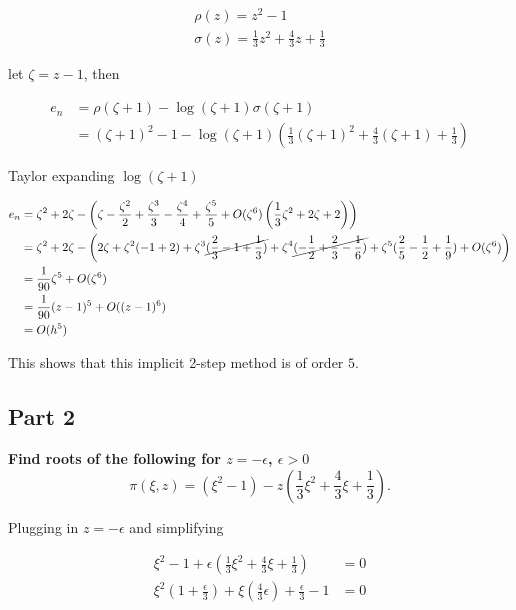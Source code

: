\documentclass[12pt,a4paper]{article}
\begin{document}
 \begin{align*}
   \rho(z) = z^{2}-1 \\
   \sigma(z) = \frac{1}{3}z^{2} + \frac{4}{3}z + \frac{1}{3}
 \end{align*}

 let $ \zeta=z-1$, then
 
 \begin{align*}
   e_n &=\rho( \zeta + 1) - \log( \zeta + 1) \sigma( \zeta + 1) \\
        &= ( \zeta + 1)^{2} -1 -\log( \zeta + 1) \left( \frac{1}{3} ( \zeta
       +1)^{2} + \frac{4}{3}( \zeta + 1) + \frac{1}{3} \right)
 \end{align*}

 Taylor expanding $\log( \zeta+1)$

 \begin{align*}
   e_n &= \zeta^2 + 2 \zeta - \left( \zeta - \frac{\zeta^{2}}{2}
   + \frac{\zeta^{3}}{3} - \frac{\zeta^{4}}{4} + \frac{\zeta^{5}}{5} + O(
 \zeta^{6}) \left( \frac{1}{3} \zeta^{2} + 2 \zeta + 2\right)\right) \\
       &=\zeta^2 + 2 \zeta - \left(2 \zeta + \zeta^{2}(-1+2)
         + \zeta^{3}\cancel{(
         \frac{2}{3} -1 + \frac{1}{3})} + \zeta^{4}\cancel{(- \frac{1}{2} + \frac{2}{3}
       - \frac{1}{6})} + \zeta^{5} (\frac{2}{5}- \frac{1}{2} + \frac{1}{9}) + O(
   \zeta^{6})\right) \\
       &= \frac{1}{90} \zeta^{5} + O( \zeta^{6}) \\
       &= \frac{1}{90} (z-1)^{5} + O( (z-1)^{6}) \\
       &= O(h^{5})
 \end{align*}

 This shows that this implicit 2-step method is of order $5$.

 \subsection{Part 2}%
 \label{sub:part_2}

 \textbf{Find roots of the following for $z = - \epsilon$, $\epsilon > 0$} 
 \[
   \pi( \xi, z) = (\xi^{2} -1) - z\left(\frac{1}{3} \xi^{2}+ \frac{4}{3} \xi
   + \frac{1}{3}\right)
 .\] 

 Plugging in $z = -\epsilon$ and simplifying

  \begin{align*}
    \xi^{2} -1 + \epsilon \left( \frac{1}{3} \xi^{2} + \frac{4}{3} \xi
    + \frac{1}{3}\right) &= 0 \\
    \xi^{2} \left(1 + \frac{\epsilon}{3}\right) + \xi \left( \frac{4}{3}
  \epsilon\right) + \frac{\epsilon}{3} - 1 &= 0
 \end{align*}
 
\end{document}
